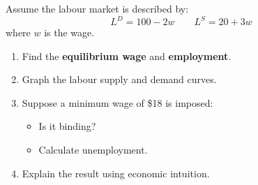 \documentclass[12pt]{article}
\begin{document}
Assume the labour market is described by:
\[
L^D = 100 - 2w
\qquad
L^S = 20 + 3w
\]
where \(w\) is the wage.

\begin{enumerate}
    \item Find the \textbf{equilibrium wage} and \textbf{employment}.
    \item Graph the labour supply and demand curves.
    \item Suppose a minimum wage of \$18 is imposed:
    \begin{itemize}
        \item Is it binding?
        \item Calculate unemployment.
    \end{itemize}
    \item Explain the result using economic intuition.
\end{enumerate}
\end{document}
